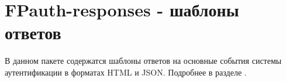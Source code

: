 \section{FPauth-responses - шаблоны ответов\label{fpauth-responses---шаблоны-ответов}}\label{page-FPauth-responses-leaf-page-index}%
В данном пакете содержатся шаблоны ответов на основные события системы аутентификации в форматах HTML и JSON. Подробнее в разделе 
\hyperref[page-FPauth-responses-module-FPauth+u+responses]{}{}.
